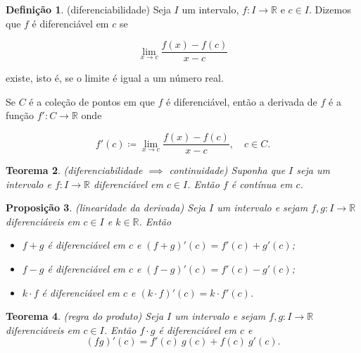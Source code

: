 \documentclass[12pt]{article}
\theoremstyle{plain}
\newtheorem{thm}{Teorema}[section]
\newtheorem{prop}[thm]{Proposição}
\theoremstyle{definition}
\newtheorem{defn}[thm]{Definição}
\theoremstyle{remark}
\begin{document}
\begin{defn} (diferenciabilidade)
    Seja \(I\) um intervalo, \(f: I \to \mathbb{R}\) e \(c \in I\). Dizemos que \(f\) é diferenciável em \(c\) se

    \begin{equation}
        \lim_{x \to c} \frac{f(x) - f(c)}{x - c}
    \end{equation}

    \noindent existe, isto é, se o limite é igual a um número real.

    Se \(C\) é a coleção de pontos em que \(f\) é diferenciável, então a derivada de \(f\) é a função \(f': C \to \mathbb{R}\) onde

    \begin{equation}
        f'(c) \coloneq \lim_{x \to c} \frac{f(x) - f(c)}{x - c}, \quad c \in C.
    \end{equation}
\end{defn}

\begin{thm} (diferenciabilidade \(\implies\) continuidade)
    Suponha que \(I\) seja um intervalo e \(f: I \to \mathbb{R}\) diferenciável em \(c \in I\). Então \(f\) é contínua em \(c\).
\end{thm}

\begin{prop} (linearidade da derivada)
    Seja \(I\) um intervalo e sejam \(f, g : I \to \mathbb{R}\) diferenciáveis em \(c \in I\) e \(k \in \mathbb{R}\). Então
    \begin{itemize}
        \item [(i)] \(f + g\) é diferenciável em \(c\) e \((f + g)'(c) = f'(c) + g'(c)\);
        \item [(ii)] \(f - g\) é diferenciável em \(c\) e \((f - g)'(c) = f'(c) - g'(c)\);
        \item [(iii)] \(k \cdot f\) é diferenciável em \(c\) e \((k \cdot f)'(c) = k \cdot f'(c)\).
    \end{itemize}
\end{prop}

\begin{thm} (regra do produto)
    Seja \(I\) um intervalo e sejam \(f, g : I \to \mathbb{R}\) diferenciáveis em \(c \in I\). Então \(f \cdot g\) é diferenciável em \(c\) e
    \begin{equation}
        (fg)'(c) = f'(c)\ g(c) + f(c)\ g'(c).
    \end{equation}
\end{thm}
\end{document}
